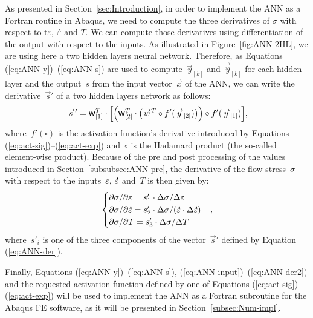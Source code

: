 \documentclass[algorithms,article,accept,pdftex,oneauthor]{Definitions/mdpi}
\DeclareRobustCommand{\w}{\mbox{\large\ensuremath{\mathsf{w}}}}
\DeclareRobustCommand{\lay}[1]{_{[#1]}}
\DeclareRobustCommand{\mdot}[1]{\accentset{\mbox{\bfseries .}}{#1}}
\begin{document}
As presented in Section~\ref{sec:Introduction}, in order to implement the ANN as a Fortran routine in Abaqus, we need to compute the three derivatives of $\sigma$ with respect to t$\varepsilon$, $\mdot{\varepsilon}$ and $T$.
We can compute those derivatives using differentiation of the output with respect to the inputs.
As illustrated in Figure~\ref{fig:ANN-2HL}, we are using here a two hidden layers neural network.
Therefore, as Equations (\ref{eq:ANN-y})--(\ref{eq:ANN-s}) are used to compute~$\overrightarrow{y}\lay{k}$ and~$\overrightarrow{\hat{y}}\lay{k}$ for each hidden layer and the output~$s$ from the input vector~$\overrightarrow{x}$ of the ANN, we can write the derivative~$\overrightarrow{s}'$ of a two hidden layers network as follows: %
\begin{equation}
\overrightarrow{s}' = \w\lay{1}^T \cdot\left[\left(\w\lay{2}^T \cdot \left(\overrightarrow{w}^T \circ f'(\overrightarrow{y}\lay{2})\right)\right) \circ f'(\overrightarrow{y}\lay{1})\right] \label{eq:ANN-der},
\end{equation}
where~$f'\left(\square\right)$ is the activation function's derivative introduced by Equations (\ref{eq:act-sig})--(\ref{eq:act-exp}) and~$\circ$ is the Hadamard product (the so-called element-wise product).
Because of the pre and post processing of the values introduced in Section~\ref{subsubsec:ANN-pre}, the derivative of the flow stress~$\sigma$ with respect to the inputs~$\varepsilon$, $\mdot{\varepsilon}$ and~$T$ is then given by:
\begin{equation}
\begin{cases}
\partial \sigma/\partial \varepsilon = s'_{1}\cdot\Delta\sigma / \Delta\varepsilon\\
\partial \sigma/\partial\mdot{\varepsilon} = s'_{2}\cdot\Delta\sigma / (\mdot{\varepsilon}\cdot\Delta\mdot{\varepsilon})\\
\partial \sigma/\partial T = s'_{3}\cdot\Delta\sigma / \Delta T
\end{cases}
\label{eq:ANN-der2},
\end{equation}
where~$s'_i$ is one of the three components of the vector~$\overrightarrow{s}'$ defined by Equation (\ref{eq:ANN-der}).

Finally, Equations (\ref{eq:ANN-y})--(\ref{eq:ANN-s}), (\ref{eq:ANN-input})--(\ref{eq:ANN-der2}) and the requested activation function defined by one of Equations (\ref{eq:act-sig})--(\ref{eq:act-exp}) will be used to implement the ANN as a Fortran subroutine for the Abaqus FE software, as it will be presented in Section~\ref{subsec:Num-impl}.
\end{document}
